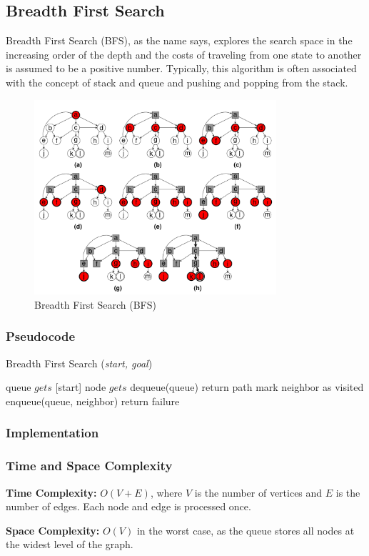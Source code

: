 \subsection{Breadth First Search}
\noindent Breadth First Search (BFS), as the name says, explores the search space in the increasing order of the depth and the costs of traveling from one state to another is assumed to be a positive number. Typically, this algorithm is often associated with the concept of stack and queue and pushing and popping from the stack.

\begin{figure}[H]
	\centering
	\includegraphics[width=0.8\textwidth]{./imgs/bfs.png}
	\caption{Breadth First Search (BFS)}
\end{figure}

\subsubsection{Pseudocode}
\begin{algorithm}[H]
	\caption{Breadth First Search (\textit{start, goal})}\label{alg:bfs}
	\begin{algorithmic}[1]
		\State queue \(gets\) [start]
		\State node \(gets\) dequeue(queue)
		\State return path
		\EndIf
		\State mark neighbor as visited
		\State enqueue(queue, neighbor)
		\EndIf
		\EndFor
		\EndWhile
		\State return failure
	\end{algorithmic}
\end{algorithm}

\subsubsection{Implementation}

\subsubsection{Time and Space Complexity}
\textbf{Time Complexity:} \(O(V + E)\), where \(V\) is the number of vertices and \(E\) is the number of edges. Each node and edge is processed once.

\textbf{Space Complexity:} \(O(V)\) in the worst case, as the queue stores all nodes at the widest level of the graph.